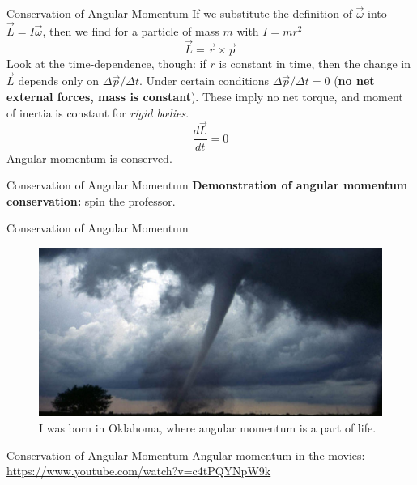 \documentclass{beamer}
\begin{document}
\begin{frame}{Conservation of Angular Momentum}
\small
If we substitute the definition of $\vec{\omega}$ into $\vec{L} = I\vec{\omega}$, then we find for a particle of mass $m$ with $I = mr^2$
\begin{equation}
\vec{L} = \vec{r} \times \vec{p}
\end{equation}
Look at the time-dependence, though: if $r$ is constant in time, then the change in $\vec{L}$ depends only on $\Delta\vec{p}/\Delta t$.  Under certain conditions $\Delta\vec{p}/\Delta t = 0$ (\textbf{no net external forces, mass is constant}).  \alert{These imply no net torque, and moment of inertia is constant for \textit{rigid bodies}.}
\begin{equation}
\boxed{\frac{d\vec{L}}{dt} = 0}
\end{equation}
Angular momentum is conserved.
\end{frame}

\begin{frame}{Conservation of Angular Momentum}
\textbf{Demonstration of angular momentum conservation:} spin the professor.
\end{frame}

\begin{frame}{Conservation of Angular Momentum}
\begin{figure}
\centering
\includegraphics[width=\textwidth]{figures/twister.png}
\caption{\label{fig:twist}  I was born in Oklahoma, where angular momentum is a part of life.}
\end{figure}
\end{frame}

\begin{frame}{Conservation of Angular Momentum}
Angular momentum in the movies:
\url{https://www.youtube.com/watch?v=c4tPQYNpW9k}
\end{frame}
\end{document}
